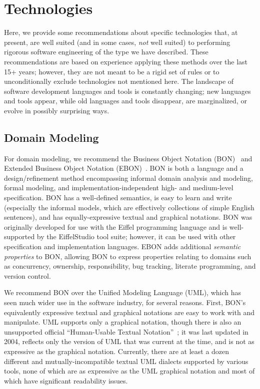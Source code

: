 \section{Technologies}
\label{sec:technologies}

Here, we provide some recommendations about specific technologies
that, at present, are well suited (and in some cases, \emph{not} well
suited) to performing rigorous software engineering of the type we
have described. These recommendations are based on experience applying
these methods over the last 15+ years; however, they are not meant to
be a rigid set of rules or to unconditionally exclude technologies not
mentioned here. The landscape of software development languages and
tools is constantly changing; new languages and tools appear, while
old languages and tools disappear, are marginalized, or evolve in
possibly surprising ways.

\subsection{Domain Modeling}

For domain modeling, we recommend the Business Object Notation
(BON)~\cite{walden1995seamless} and Extended Business Object Notation
(EBON)~. BON is both a language and a design/refinement method
encompassing informal domain analysis and modeling, formal modeling,
and implementation-independent high- and medium-level
specification. BON has a well-defined semantics, is easy to learn and
write (especially the informal models, which are effectively
collections of simple English sentences), and has equally-expressive
textual and graphical notations. BON was originally developed for use
with the Eiffel programming language and is well-supported by the
EiffelStudio tool suite; however, it can be used with other
specification and implementation languages. EBON adds additional
\emph{semantic properties} to BON, allowing BON to express properties
relating to domains such as concurrency, ownership, responsibility,
bug tracking, literate programming, and version control.

We recommend BON over the Unified Modeling Language (UML), which has
seen much wider use in the software industry, for several
reasons. First, BON's equivalently expressive textual and graphical
notations are easy to work with and manipulate. UML supports only a
graphical notation, though there is also an unsupported official
``Human-Usable Textual Notation''~\cite{HUTN}; it was last updated in
2004, reflects only the version of UML that was current at the time,
and is not as expressive as the graphical notation. Currently, there
are at least a dozen different and mutually-incompatible textual UML
dialects supported by various tools, none of which are as expressive
as the UML graphical notation and most of which have significant
readability issues.

